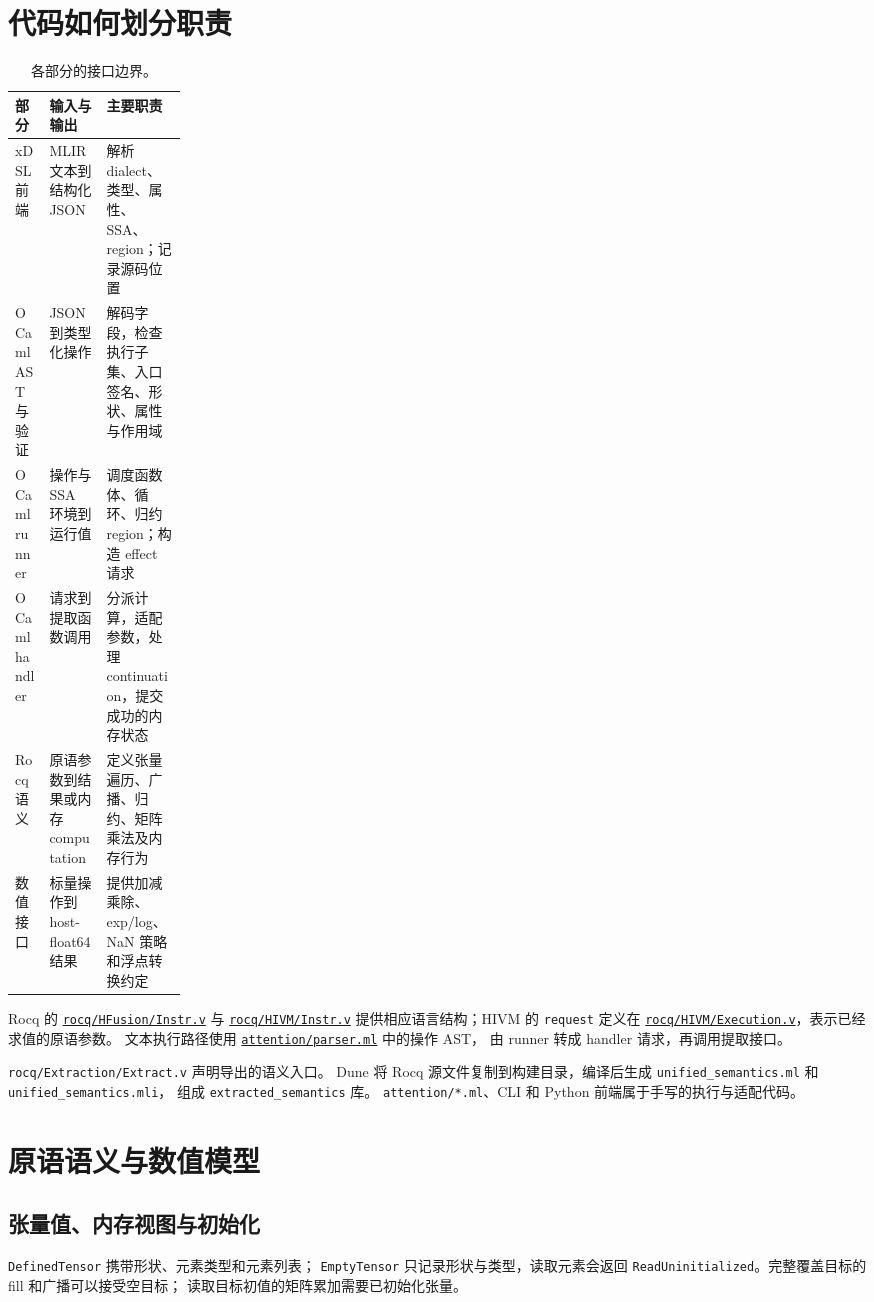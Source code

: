 \documentclass[UTF8,a4paper,11pt,fontset=fandol]{ctexart}
\newcommand{\code}{\nolinkurl}
\newcommand{\src}[1]{\href{run:../#1}{\nolinkurl{#1}}}
\begin{document}
{\section{代码如何划分职责}

\begin{table}[htbp]
\centering\small
\begin{tabularx}{\linewidth}{@{}p{0.20\linewidth}YY@{}}
\toprule
部分 & 输入与输出 & 主要职责\\
\midrule
xDSL 前端 & MLIR 文本到结构化 JSON & 解析 dialect、类型、属性、SSA、region；记录源码位置\\
OCaml AST 与验证 & JSON 到类型化操作 & 解码字段，检查执行子集、入口签名、形状、属性与作用域\\
OCaml runner & 操作与 SSA 环境到运行值 & 调度函数体、循环、归约 region；构造 effect 请求\\
OCaml handler & 请求到提取函数调用 & 分派计算，适配参数，处理 continuation，提交成功的内存状态\\
Rocq 语义 & 原语参数到结果或内存 computation & 定义张量遍历、广播、归约、矩阵乘法及内存行为\\
数值接口 & 标量操作到 host-float64 结果 & 提供加减乘除、exp/log、NaN 策略和浮点转换约定\\
\bottomrule
\end{tabularx}
\caption{各部分的接口边界。}
\end{table}

Rocq 的 \src{rocq/HFusion/Instr.v} 与 \src{rocq/HIVM/Instr.v}
提供相应语言结构；HIVM 的 \code{request} 定义在
\src{rocq/HIVM/Execution.v}，表示已经求值的原语参数。
文本执行路径使用 \src{attention/parser.ml} 中的操作 AST，
由 runner 转成 handler 请求，再调用提取接口。

\code{rocq/Extraction/Extract.v} 声明导出的语义入口。
Dune 将 Rocq 源文件复制到构建目录，编译后生成
\code{unified_semantics.ml} 和 \code{unified_semantics.mli}，
组成 \code{extracted_semantics} 库。
\code{attention/*.ml}、CLI 和 Python 前端属于手写的执行与适配代码。

\section{原语语义与数值模型}

\subsection{张量值、内存视图与初始化}

\code{DefinedTensor} 携带形状、元素类型和元素列表；
\code{EmptyTensor} 只记录形状与类型，读取元素会返回
\code{ReadUninitialized}。完整覆盖目标的 fill 和广播可以接受空目标；
读取目标初值的矩阵累加需要已初始化张量。

}
\end{document}
